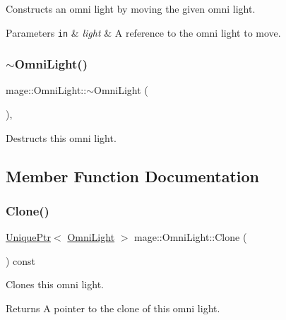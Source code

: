 Constructs an omni light by moving the given omni light.


\begin{DoxyParams}[1]{Parameters}
\mbox{\tt in}  & {\em light} & A reference to the omni light to move. \\
\hline
\end{DoxyParams}
\hypertarget{classmage_1_1_omni_light_af6f4921499b430041966f38aac920b69}{}\label{classmage_1_1_omni_light_af6f4921499b430041966f38aac920b69} 
\subsubsection{\texorpdfstring{$\sim$\+Omni\+Light()}{~OmniLight()}}
{\footnotesize\ttfamily mage\+::\+Omni\+Light\+::$\sim$\+Omni\+Light (\begin{DoxyParamCaption}{ }\end{DoxyParamCaption})\hspace{0.3cm}{\ttfamily [virtual]}, {\ttfamily [default]}}

Destructs this omni light. 

\subsection{Member Function Documentation}
\hypertarget{classmage_1_1_omni_light_a82325924de65733314dcf2b87e926d60}{}\label{classmage_1_1_omni_light_a82325924de65733314dcf2b87e926d60} 
\subsubsection{\texorpdfstring{Clone()}{Clone()}}
{\footnotesize\ttfamily \hyperlink{namespacemage_a8c307fbcc33bce9b7f2aa4c26c3b95cf}{Unique\+Ptr}$<$ \hyperlink{classmage_1_1_omni_light}{Omni\+Light} $>$ mage\+::\+Omni\+Light\+::\+Clone (\begin{DoxyParamCaption}{ }\end{DoxyParamCaption}) const}

Clones this omni light.

\begin{DoxyReturn}{Returns}
A pointer to the clone of this omni light. 
\end{DoxyReturn}
\hypertarget{classmage_1_1_omni_light_a1212457828cdd96cc7170767b7bd1223}{}\label{classmage_1_1_omni_light_a1212457828cdd96cc7170767b7bd1223} 
